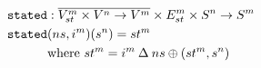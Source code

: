 \documentclass[preview]{standalone}
\begin{document}
\begin{align*}
  \texttt{stated} &: \overline{V^m_{st} \times V^n \rightarrow V^m} \times E^m_{st}
                   \times S^n \rightarrow S^m \\
  \texttt{stated} &(ns,i^m)(s^n) = st^m \\
                 &\text{where}\ st^m = i^m \mathbin{\Delta} ns \oplus (st^m, s^n) 
\end{align*}
\end{document}
